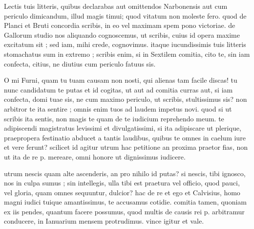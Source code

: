 


 Lectis tuis litteris, quibus declarabas aut omittendos Narbonensis aut cum periculo dimicandum, illud magis timui; quod vitatum non moleste fero. quod de Planci et Bruti concordia scribis, in eo vel maximam spem pono victoriae. de Gallorum studio nos aliquando cognoscemus, ut scribis, cuius id opera maxime excitatum sit ; sed iam, mihi crede, cognovimus. itaque iucundissimis tuis litteris stomachatus sum in extremo ; scribis enim, si in Sextilem comitia, cito te, sin iam confecta, citius, ne diutius cum periculo fatuus sis.

 O mi Furni, quam tu tuam causam non nosti, qui alienas tam facile discas! tu nunc candidatum te putas et id cogitas, ut aut ad comitia curras aut, si iam confecta, domi tuae sis, ne cum maximo periculo, ut scribis, stultissimus sis? non arbitror te ita sentire ; omnis enim tuos ad laudem impetus novi. quod si ut scribis ita sentis, non magis te quam de te iudicium reprehendo meum. te adipiscendi magistratus levissimi et divulgatissimi, si ita adipiscare ut plerique, praepropera festinatio abducet a tantis laudibus, quibus te omnes in caelum iure et vere ferunt? scilicet id agitur utrum hac petitione an proxima praetor fias, non ut ita de re p. mereare, omni honore ut dignissimus iudicere.

 utrum nescis quam alte ascenderis, an pro nihilo id putas? si nescis, tibi ignosco, nos in culpa sumus ; sin intellegis, ulla tibi est praetura vel officio, quod pauci, vel gloria, quam omnes sequuntur, dulcior? hac de re et ego et Calvisius, homo magni iudici tuique amantissimus, te accusamus cotidie. comitia tamen, quoniam ex iis pendes, quantum facere possumus, quod multis de causis rei p. arbitramur conducere, in Ianuarium mensem protrudimus. vince igitur et vale.
